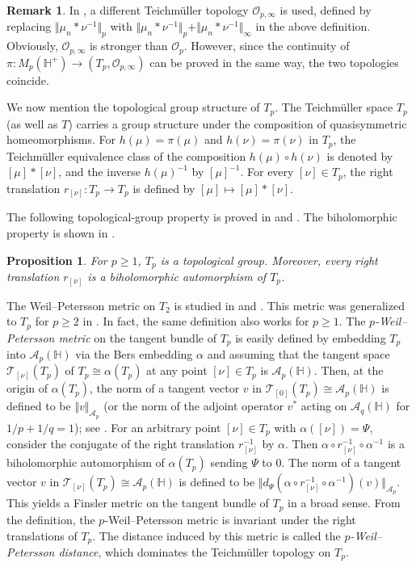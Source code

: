 \documentclass[amstex,12pt,reqno]{amsart}
\newtheorem{proposition}[theorem]{Proposition}
\theoremstyle{definition}
\newtheorem{remark}{Remark}
\begin{document}
\begin{remark}
In \cite{WM-1}, a different Teich\-m\"ul\-ler topology $\mathcal O_{p,\infty}$ is used, defined by
replacing $\Vert \mu_n \ast \nu^{-1}\Vert_p$ with
$\Vert \mu_n \ast \nu^{-1}\Vert_p +\Vert \mu_n \ast \nu^{-1}\Vert_\infty$ in the above definition.
Obviously, $\mathcal O_{p,\infty}$ is stronger than $\mathcal O_{p}$.
However, since the continuity of $\pi:M_p(\mathbb H^+) \to (T_p,\mathcal O_{p,\infty})$ 
can be proved in the same way,
the two topologies coincide.
\end{remark}

We now mention the topological group structure of $T_p$.
The Teich\-m\"ul\-ler space $T_p$ (as well as $T$) carries a group structure under the composition of
quasisymmetric homeomorphisms. For $h(\mu)=\pi(\mu)$ and $h(\nu)=\pi(\nu)$ in $T_p$,
the Teich\-m\"ul\-ler equivalence class of
the composition $h(\mu) \circ h(\nu)$ is denoted by $[\mu] \ast [\nu]$, and
the inverse $h(\mu)^{-1}$ by $[\mu]^{-1}$.
For every $[\nu] \in T_p$, the right translation $r_{[\nu]}:T_p \to T_p$
is defined by $[\mu] \mapsto [\mu] \ast [\nu]$.

The following topological-group property
is proved in \cite[Theorem I.3.8]{TT} and \cite[Theorem 6.1]{WM-4}.
The biholomorphic property is shown in \cite[Section 4]{WM-1}.

\begin{proposition}
For $p \geq 1$, $T_p$ is a topological group. 
Moreover,
every right translation $r_{[\nu]}$ is a biholomorphic automorphism of $T_p$.
\end{proposition}

The Weil--Petersson metric on $T_2$ is studied in \cite{Cu} and \cite{TT}.
This metric was generalized to $T_p$ for $p \geq 2$ in \cite{Ma1}.
In fact, the same definition also works for $p \geq 1$.
The {\it $p$-Weil--Petersson metric} on the tangent bundle of $T_p$ is easily defined by embedding $T_p$ 
into $\mathcal A_p(\mathbb H)$ via the Bers embedding $\alpha$ and assuming that
the tangent space ${\mathscr T}_{[\nu]}(T_p)$ of $T_p \cong \alpha(T_p)$ at any point $[\nu] \in T_p$ 
is $\mathcal A_p(\mathbb H)$.
Then, at the origin of $\alpha(T_p)$, the norm of a tangent vector $v$
in ${\mathscr T}_{[0]}(T_p) \cong  \mathcal A_p(\mathbb H)$
is defined to be $\Vert v \Vert_{{\mathcal A}_p}$ (or the norm of the adjoint operator $v^*$
acting on $\mathcal A_q(\mathbb H)$ for $1/p+1/q=1$); see \cite[Section 6.5]{Ma0}. 
For an arbitrary point $[\nu] \in T_p$ with $\alpha([\nu])=\Psi$, consider
the conjugate of the right translation $r_{[\nu]}^{-1}$ by $\alpha$.
Then $\alpha \circ r_{[\nu]}^{-1} \circ \alpha^{-1}$ is a biholomorphic automorphism of $\alpha(T_p)$ sending
$\Psi$ to $0$. The norm of a tangent vector $v$
in ${\mathscr T}_{[\nu]}(T_p) \cong  \mathcal A_p(\mathbb H)$ is defined to be
$\Vert d_\Psi(\alpha \circ r_{[\nu]}^{-1} \circ \alpha^{-1})(v) \Vert_{{\mathcal A}_p}$. This yields 
a Finsler metric on the tangent bundle of $T_p$ in a broad sense.
From the definition, the $p$-Weil--Petersson metric is invariant under the right translations of $T_p$.
The distance induced by this metric is called the {\it $p$-Weil--Petersson distance},
which dominates the Teich\-m\"ul\-ler topology on $T_p$. 
\end{document}
